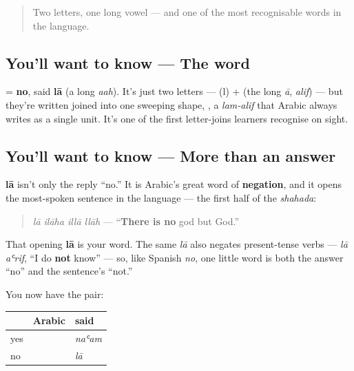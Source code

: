 \label{lesson:AR-C05-la}



\begin{quote}
Two letters, one long vowel — and one of the most recognisable words in the language.
\end{quote}

\subsection*{You'll want to know — The word}
\textbf{} = \textbf{no}, said \textbf{lā} (a long \emph{aah}). It's just two letters — \textbf{} (l) + \textbf{} (the long \emph{ā}, \emph{alif}) — but they're written joined into one sweeping shape, \textbf{}, a \emph{lam‑alif} that Arabic always writes as a single unit. It's one of the first letter-joins learners recognise on sight.

\subsection*{You'll want to know — More than an answer}
\textbf{lā} isn't only the reply \textquotedblleft{}no.\textquotedblright{} It is Arabic's great word of \textbf{negation}, and it opens the most-spoken sentence in the language — the first half of the \emph{shahada}:

\begin{quote}
\emph{lā ilāha illā llāh} — \textquotedblleft{}\textbf{There is no} god but God.\textquotedblright{}
\end{quote}

That opening \textbf{lā} is your word. The same \emph{lā} also negates present-tense verbs — \emph{lā aʿrif}, \textquotedblleft{}I do \textbf{not} know\textquotedblright{} — so, like Spanish \emph{no}, one little word is both the answer \textquotedblleft{}no\textquotedblright{} and the sentence's \textquotedblleft{}not.\textquotedblright{}

\begin{grammarlens}[title={Grammar Lens — Yes and no, together}]
You now have the pair:

\noindent
\begin{tabularx}{\linewidth}{@{}>{\raggedright\arraybackslash}X>{\raggedright\arraybackslash}X>{\raggedright\arraybackslash}X@{}}
\toprule
\textbf{} & \textbf{Arabic} & \textbf{said} \\
\midrule
yes & \textbf{\ar{نعم}} & \emph{naʿam} \\
no & \textbf{\ar{لا}} & \emph{lā} \\
\bottomrule
\end{tabularx}
\end{grammarlens}

